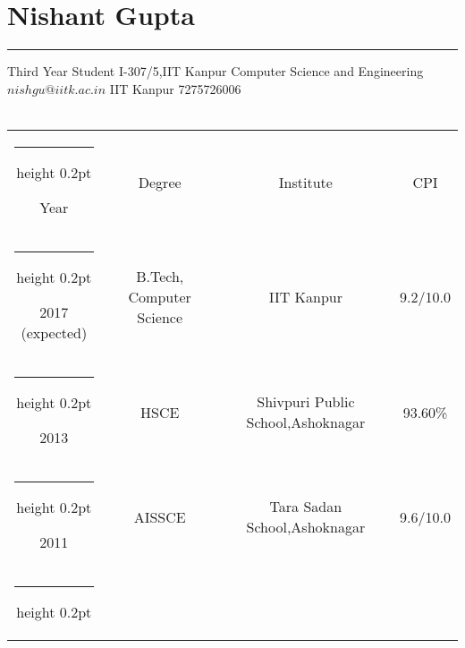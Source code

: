 \documentclass[a4paper]{article}
\author{Nishant Gupta}
\begin{document}

\section*{\textbf\Huge Nishant Gupta}
\hrule
\vspace{2mm}
Third Year Student  \hfill {I-307/5,IIT Kanpur} \newline
Computer Science and Engineering \hfill ${nishgu@iitk.ac.in}$ \newline
IIT Kanpur \hfill  {7275726006} \\ \\

\makeatletter
\newcommand{\thickhline}{%
    \noalign {\ifnum 0=`}\fi \hrule height 1pt
    \futurelet \reserved@a \@xhline
}

\makeatletter
\newcommand{\thinhline}{%
    \noalign {\ifnum 0=`}\fi \hrule height 0.2pt
    \futurelet \reserved@a \@xhline
}


\begin{center}
  \begin{tabular}{|c|c|c|c|} 
    \thinhline
    {\centering Year} & {\centering Degree} & {\centering Institute} & {\centering CPI} \\  
    \thinhline
    2017 (expected) & {B.Tech,  Computer Science} & IIT Kanpur  & 9.2/10.0  \\ 
    \thinhline
    2013 & {HSCE} & Shivpuri Public School,Ashoknagar & 			93.60\%	\\
    \thinhline
    2011 & AISSCE & Tara Sadan School,Ashoknagar  & 9.6/10.0   \\
    \thinhline

  \end{tabular}
\end{center}
\end{document}
